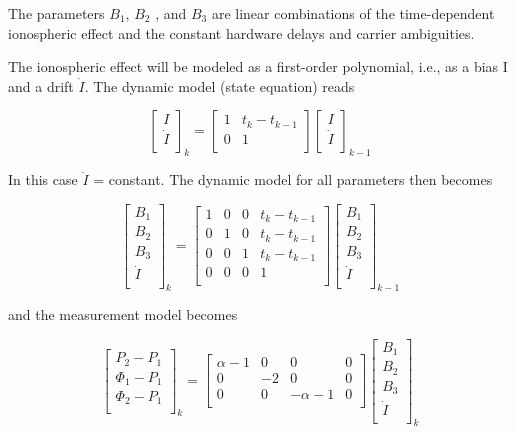 The parameters $B_{1}$, $B_{2}$ , and $B_{3}$ are linear combinations of the time-dependent ionospheric effect and the constant hardware delays and carrier ambiguities.

The ionospheric effect will be modeled as a first-order polynomial, i.e., as a bias I and a drift $\dot{I}$. The dynamic model (state equation) reads

$$
\begin{bmatrix}
I\\
\dot{I}\\
\end{bmatrix}_{k}
=\begin{bmatrix}
1&t_{k}-t_{k-1}\\
0&1\\
\end{bmatrix}
\begin{bmatrix}
I\\
\dot{I}\\
\end{bmatrix}_{k-1}
$$

In this case $\dot{I}$ = constant. The dynamic model for all parameters then becomes

$$
\begin{bmatrix}
B_{1}\\
B_{2}\\
B_{3}\\
\dot{I}\\
\end{bmatrix}_{k}
=\begin{bmatrix}
1&0&0&t_{k}-t_{k-1}\\
0&1&0&t_{k}-t_{k-1}\\
0&0&1&t_{k}-t_{k-1}\\
0&0&0&1\\
\end{bmatrix}
\begin{bmatrix}
B_{1}\\
B_{2}\\
B_{3}\\
\dot{I}\\
\end{bmatrix}_{k-1}
$$

and the measurement model becomes

$$
\begin{bmatrix}
P_{2}-P_{1}\\
\Phi_{1}-P_{1}\\
\Phi_{2}-P_{1}\\
\end{bmatrix}_{k}
=\begin{bmatrix}
\alpha-1&0&0&0\\
0&-2&0&0\\
0&0&-\alpha-1&0\\
\end{bmatrix}
\begin{bmatrix}
B_{1}\\
B_{2}\\
B_{3}\\
\dot{I}\\
\end{bmatrix}_{k}
$$

